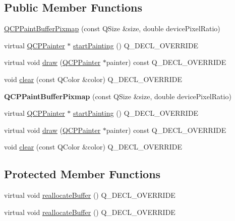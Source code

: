 \subsection*{Public Member Functions}
\begin{DoxyCompactItemize}
\item 
\hyperlink{class_q_c_p_paint_buffer_pixmap_aef0224e03b9285509391fcd61a8e6844}{Q\+C\+P\+Paint\+Buffer\+Pixmap} (const Q\+Size \&size, double device\+Pixel\+Ratio)
\item 
virtual \hyperlink{class_q_c_p_painter}{Q\+C\+P\+Painter} $\ast$ \hyperlink{class_q_c_p_paint_buffer_pixmap_a357964ef7d28cfa530338be4e5c93234}{start\+Painting} () Q\+\_\+\+D\+E\+C\+L\+\_\+\+O\+V\+E\+R\+R\+I\+DE
\item 
virtual void \hyperlink{class_q_c_p_paint_buffer_pixmap_af7bfc685e56a0a9329e57cd9a265eb74}{draw} (\hyperlink{class_q_c_p_painter}{Q\+C\+P\+Painter} $\ast$painter) const Q\+\_\+\+D\+E\+C\+L\+\_\+\+O\+V\+E\+R\+R\+I\+DE
\item 
void \hyperlink{class_q_c_p_paint_buffer_pixmap_a14badbd010a3cde6b55817ccb7b65217}{clear} (const Q\+Color \&color) Q\+\_\+\+D\+E\+C\+L\+\_\+\+O\+V\+E\+R\+R\+I\+DE
\item 
{\bfseries Q\+C\+P\+Paint\+Buffer\+Pixmap} (const Q\+Size \&size, double device\+Pixel\+Ratio)\hypertarget{class_q_c_p_paint_buffer_pixmap_aef0224e03b9285509391fcd61a8e6844}{}\label{class_q_c_p_paint_buffer_pixmap_aef0224e03b9285509391fcd61a8e6844}

\item 
virtual \hyperlink{class_q_c_p_painter}{Q\+C\+P\+Painter} $\ast$ \hyperlink{class_q_c_p_paint_buffer_pixmap_a0b919d080c2551ee35aedccebde0a67d}{start\+Painting} () Q\+\_\+\+D\+E\+C\+L\+\_\+\+O\+V\+E\+R\+R\+I\+DE
\item 
virtual void \hyperlink{class_q_c_p_paint_buffer_pixmap_a7f8df231d2439e6b9953b86798815600}{draw} (\hyperlink{class_q_c_p_painter}{Q\+C\+P\+Painter} $\ast$painter) const Q\+\_\+\+D\+E\+C\+L\+\_\+\+O\+V\+E\+R\+R\+I\+DE
\item 
void \hyperlink{class_q_c_p_paint_buffer_pixmap_a14badbd010a3cde6b55817ccb7b65217}{clear} (const Q\+Color \&color) Q\+\_\+\+D\+E\+C\+L\+\_\+\+O\+V\+E\+R\+R\+I\+DE
\end{DoxyCompactItemize}
\subsection*{Protected Member Functions}
\begin{DoxyCompactItemize}
\item 
virtual void \hyperlink{class_q_c_p_paint_buffer_pixmap_ad49f3205ba3463b1c44f8db3cfcc90f0}{reallocate\+Buffer} () Q\+\_\+\+D\+E\+C\+L\+\_\+\+O\+V\+E\+R\+R\+I\+DE
\item 
virtual void \hyperlink{class_q_c_p_paint_buffer_pixmap_a055692ff7293153ed5c589f3d7a6718e}{reallocate\+Buffer} () Q\+\_\+\+D\+E\+C\+L\+\_\+\+O\+V\+E\+R\+R\+I\+DE
\end{DoxyCompactItemize}
